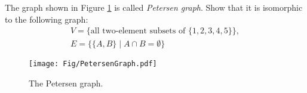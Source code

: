 
\begin{exc}
The graph shown in Figure \ref{fig:Petersen} is called \emph{Petersen graph}.
Show that it is isomorphic to the following graph:
\begin{gather*}
V = \{\text{all two-element subsets of }\{1, 2, 3, 4, 5\}\},\\
E = \{\{A, B\} \mid A \cap B = \emptyset\}
\end{gather*}
\end{exc}

\begin{figure}[h]
\begin{center}
\texttt{[image: Fig/PetersenGraph.pdf]}
\end{center}
\caption{The Petersen graph.}
\label{fig:Petersen}
\end{figure}
